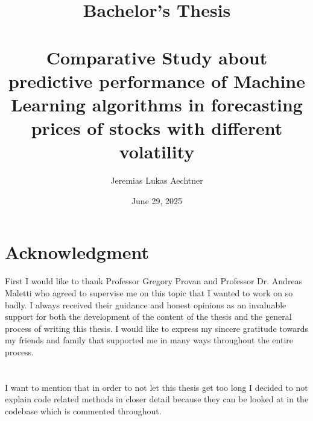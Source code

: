 \documentclass[a4paper,12pt]{report}
\title{Bachelor's Thesis\\ \
\\
Comparative Study about predictive performance of Machine Learning algorithms in forecasting prices of stocks with different volatility}
\author{Jeremias Lukas Aechtner}
\date{June 29, 2025}
\begin{document}
\maketitle


\section*{Acknowledgment}
First I would like to thank Professor Gregory Provan and Professor Dr. Andreas Maletti who agreed to supervise me on this topic that I wanted to work on so badly. I always received their guidance and honest opinions as an invaluable support for both the development of the content of the thesis and the general process of writing this thesis. I would like to express my sincere gratitude towards my friends and family that supported me in many ways throughout the entire process. \\
\\
\\
I want to mention that in order to not let this thesis get too long I decided to not explain code related methods in closer detail because they can be looked at in the codebase which is commented throughout.



\newpage

\tableofcontents

\newpage
\end{document}
